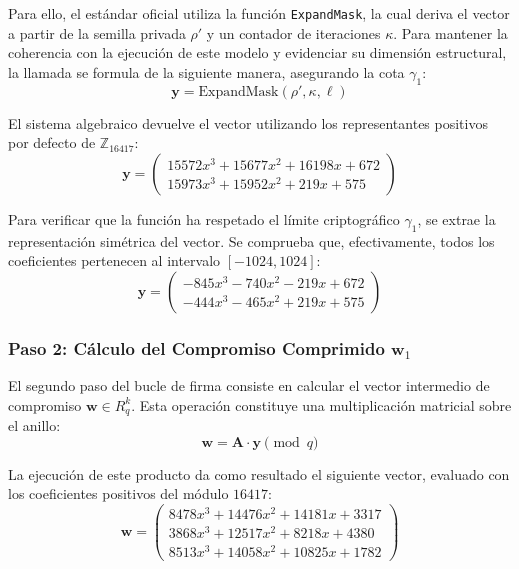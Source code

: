 \documentclass[11pt, a4paper]{report}
\theoremstyle{definition}
\begin{document}
Para ello, el estándar oficial utiliza la función \texttt{ExpandMask}, la cual deriva el vector a partir de la semilla privada $\rho'$ y un contador de iteraciones $\kappa$. Para mantener la coherencia con la ejecución de este modelo y evidenciar su dimensión estructural, la llamada se formula de la siguiente manera, asegurando la cota $\gamma_1$:
\begin{equation}
    \mathbf{y} = \text{ExpandMask}(\rho', \kappa, \ell)
\end{equation}

El sistema algebraico devuelve el vector utilizando los representantes positivos por defecto de $\mathbb{Z}_{16417}$:
\begin{equation}
    \mathbf{y} = \begin{pmatrix}
    15572x^3 + 15677x^2 + 16198x + 672 \\
    15973x^3 + 15952x^2 + 219x + 575
    \end{pmatrix}
\end{equation}

Para verificar que la función ha respetado el límite criptográfico $\gamma_1$, se extrae la representación simétrica del vector. Se comprueba que, efectivamente, todos los coeficientes pertenecen al intervalo $[-1024, 1024]$:
\begin{equation}
    \mathbf{y} = \begin{pmatrix}
    -845x^3 - 740x^2 - 219x + 672 \\
    -444x^3 - 465x^2 + 219x + 575
    \end{pmatrix}
\end{equation}

\subsubsection*{Paso 2: Cálculo del Compromiso Comprimido $\mathbf{w}_1$}
El segundo paso del bucle de firma consiste en calcular el vector intermedio de compromiso $\mathbf{w} \in R_q^k$. Esta operación constituye una multiplicación matricial sobre el anillo:
\begin{equation}
    \mathbf{w} = \mathbf{A} \cdot \mathbf{y} \pmod{q}
\end{equation}

La ejecución de este producto da como resultado el siguiente vector, evaluado con los coeficientes positivos del módulo $16417$:
\begin{equation}
    \mathbf{w} = \begin{pmatrix}
    8478x^3 + 14476x^2 + 14181x + 3317 \\
    3868x^3 + 12517x^2 + 8218x + 4380 \\
    8513x^3 + 14058x^2 + 10825x + 1782
    \end{pmatrix}
\end{equation}
\end{document}
